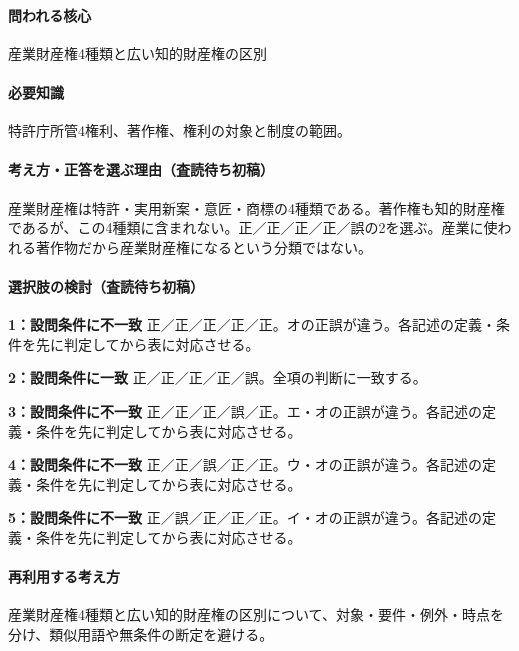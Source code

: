 \paragraph{問われる核心} 産業財産権4種類と広い知的財産権の区別

\paragraph{必要知識} 特許庁所管4権利、著作権、権利の対象と制度の範囲。

\paragraph{考え方・正答を選ぶ理由（査読待ち初稿）} 産業財産権は特許・実用新案・意匠・商標の4種類である。著作権も知的財産権であるが、この4種類に含まれない。正／正／正／正／誤の2を選ぶ。産業に使われる著作物だから産業財産権になるという分類ではない。

\paragraph{選択肢の検討（査読待ち初稿）}\mbox{}\par

\noindent\textbf{1：設問条件に不一致} 正／正／正／正／正。オの正誤が違う。各記述の定義・条件を先に判定してから表に対応させる。\par

\noindent\textbf{2：設問条件に一致} 正／正／正／正／誤。全項の判断に一致する。\par

\noindent\textbf{3：設問条件に不一致} 正／正／正／誤／正。エ・オの正誤が違う。各記述の定義・条件を先に判定してから表に対応させる。\par

\noindent\textbf{4：設問条件に不一致} 正／正／誤／正／正。ウ・オの正誤が違う。各記述の定義・条件を先に判定してから表に対応させる。\par

\noindent\textbf{5：設問条件に不一致} 正／誤／正／正／正。イ・オの正誤が違う。各記述の定義・条件を先に判定してから表に対応させる。\par

\paragraph{再利用する考え方} 産業財産権4種類と広い知的財産権の区別について、対象・要件・例外・時点を分け、類似用語や無条件の断定を避ける。

